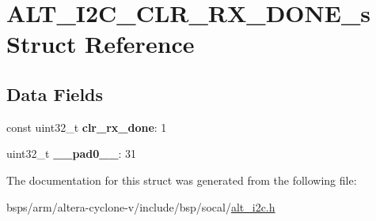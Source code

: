 \hypertarget{structALT__I2C__CLR__RX__DONE__s}{}\section{A\+L\+T\+\_\+\+I2\+C\+\_\+\+C\+L\+R\+\_\+\+R\+X\+\_\+\+D\+O\+N\+E\+\_\+s Struct Reference}
\label{structALT__I2C__CLR__RX__DONE__s}
\subsection*{Data Fields}
\begin{DoxyCompactItemize}
\item 
\mbox{\label{structALT__I2C__CLR__RX__DONE__s_aa11d4e4f4bac25edf5bf9783d1ada91f}} 
const uint32\+\_\+t {\bfseries clr\+\_\+rx\+\_\+done}\+: 1
\item 
\mbox{\label{structALT__I2C__CLR__RX__DONE__s_a4a03bd193ff61c8f2912e04b27dc35e3}} 
uint32\+\_\+t {\bfseries \+\_\+\+\_\+pad0\+\_\+\+\_\+}\+: 31
\end{DoxyCompactItemize}


The documentation for this struct was generated from the following file\+:\begin{DoxyCompactItemize}
\item 
bsps/arm/altera-\/cyclone-\/v/include/bsp/socal/\mbox{\hyperlink{socal_2alt__i2c_8h}{alt\+\_\+i2c.\+h}}\end{DoxyCompactItemize}
